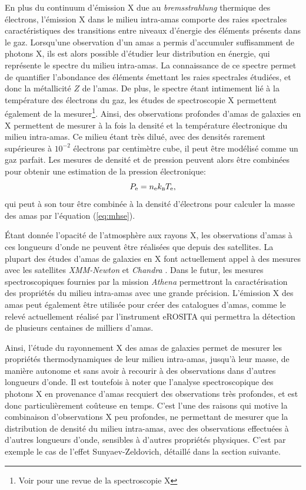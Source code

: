 En plus du continuum d'émission X due au \textit{bremsstrahlung} thermique des électrons, l'émission X dans le milieu intra-amas comporte des raies spectrales caractéristiques des transitions entre niveaux d'énergie des éléments présents dans le gaz.
Lorsqu'une observation d'un amas a permis d'accumuler suffisamment de photons X, ils est alors possible d'étudier leur distribution en énergie, qui représente le spectre du milieu intra-amas.
La connaissance de ce spectre permet de quantifier l'abondance des éléments émettant les raies spectrales étudiées, et donc la métallicité $Z$ de l'amas.
De plus, le spectre étant intimement lié à la température des électrons du gaz, les études de spectroscopie X permettent également de la mesurer\footnote{Voir \cite{bohringer_x-ray_2010} pour une revue de la spectroscopie X}.
Ainsi, des observations profondes d'amas de galaxies en X permettent de mesurer à la fois la densité et la température électronique du milieu intra-amas.
Ce milieu étant très dilué, avec des densités rarement supérieures à $10^{-2}$ électrons par centimètre cube, il peut être modélisé comme un gaz parfait.
Les mesures de densité et de pression peuvent alors être combinées pour obtenir une estimation de la pression électronique:
\begin{equation}
    \label{eq:pvnrt}
    P_{\rm e} = n_{\rm e} k_\textsc{b} T_{\rm e},
\end{equation}
qui peut à son tour être combinée à la densité d'électrons pour calculer la masse des amas par l'équation (\ref{eq:mhse}).

Étant donnée l'opacité de l'atmosphère aux rayons X, les observations d'amas à ces longueurs d'onde ne peuvent être réalisées que depuis des satellites.
La plupart des études d'amas de galaxies en X font actuellement appel à des mesures avec les satellites \textit{XMM-Newton} \cite{jansen_xmm-newton_2001} et \textit{Chandra} \cite{weisskopf_overview_2002}.
Dans le futur, les mesures spectroscopiques fournies par la mission \textit{Athena} \cite{nandra_hot_2013} permettront la caractérisation des propriétés du milieu intra-amas avec une grande précision.
L'émission X des amas peut également être utilisée pour créer des catalogues d'amas, comme le relevé actuellement réalisé par l'instrument eROSITA \cite{merloni_erosita_2012} qui permettra la détection de plusieurs centaines de milliers d'amas.

Ainsi, l'étude du rayonnement X des amas de galaxies permet de mesurer les propriétés thermodynamiques de leur milieu intra-amas, jusqu'à leur masse, de manière autonome et sans avoir à recourir à des observations dans d'autres longueurs d'onde.
Il est toutefois à noter que l'analyse spectroscopique des photons X en provenance d'amas recquiert des observations très profondes, et est donc particulièrement coûteuse en temps.
C'est l'une des raisons qui motive la combinaison d'observations X peu profondes, ne permettant de mesurer que la distribution de densité du milieu intra-amas, avec des observations effectuées à d'autres longueurs d'onde, sensibles à d'autres propriétés physiques.
C'est par exemple le cas de l'effet Sunyaev-Zeldovich, détaillé dans la section suivante.


